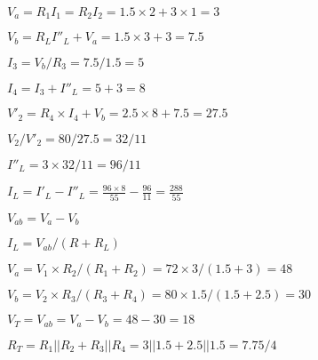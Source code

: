 \documentclass{article}
\def\lthtmlcheckvsize{\ifdim\ht\sizebox<\vsize 
  \ifdim\wd\sizebox<\hsize\expandafter\hfill\fi \expandafter\vfill
  \else\expandafter\vss\fi}%
\begin{document}
{\newpage\clearpage
{}%
$ V_a=R_1I_1=R_2I_2=1.5\times 2+3\times 1=3$%
\lthtmlindisplaymathZ
\lthtmlcheckvsize\clearpage}

{\newpage\clearpage
{}%
$ V_b=R_L I''_L+V_a=1.5\times 3+3=7.5$%
\lthtmlindisplaymathZ
\lthtmlcheckvsize\clearpage}

{\newpage\clearpage
{}%
$ I_3=V_b/R_3=7.5/1.5=5$%
\lthtmlindisplaymathZ
\lthtmlcheckvsize\clearpage}

{\newpage\clearpage
{}%
$ I_4=I_3+I''_L=5+3=8$%
\lthtmlindisplaymathZ
\lthtmlcheckvsize\clearpage}

{\newpage\clearpage
{}%
$ V'_2=R_4\times I_4+V_b=2.5\times 8+7.5=27.5$%
\lthtmlindisplaymathZ
\lthtmlcheckvsize\clearpage}

{\newpage\clearpage
{}%
$ V_2/V'_2=80/27.5=32/11$%
\lthtmlindisplaymathZ
\lthtmlcheckvsize\clearpage}

{\newpage\clearpage
{}%
$ I''_L=3\times 32/11=96/11$%
\lthtmlindisplaymathZ
\lthtmlcheckvsize\clearpage}

{\newpage\clearpage
{}%
$\displaystyle I_L=I'_L-I''_L=\frac{96\times 8}{55}-\frac{96}{11}=\frac{288}{55}$%
\lthtmlindisplaymathZ
\lthtmlcheckvsize\clearpage}

{\newpage\clearpage
{}%
$ V_{ab}=V_a-V_b$%
\lthtmlindisplaymathZ
\lthtmlcheckvsize\clearpage}

{\newpage\clearpage
{}%
$ I_L=V_{ab}/(R+R_L)$%
\lthtmlindisplaymathZ
\lthtmlcheckvsize\clearpage}

{\newpage\clearpage
{}%
$ V_a=V_1\times R_2/(R_1+R_2)=72\times 3/(1.5+3)=48$%
\lthtmlindisplaymathZ
\lthtmlcheckvsize\clearpage}

{\newpage\clearpage
{}%
$ V_b=V_2\times R_3/(R_3+R_4)=80\times 1.5/(1.5+2.5)=30$%
\lthtmlindisplaymathZ
\lthtmlcheckvsize\clearpage}

{\newpage\clearpage
{}%
$ V_T=V_{ab}=V_a-V_b=48-30=18$%
\lthtmlindisplaymathZ
\lthtmlcheckvsize\clearpage}

{\newpage\clearpage
{}%
$ R_T=R_1 || R_2 + R_3 || R_4=3||1.5+2.5||1.5=7.75/4$%
\lthtmlindisplaymathZ
\lthtmlcheckvsize\clearpage}
\end{document}
